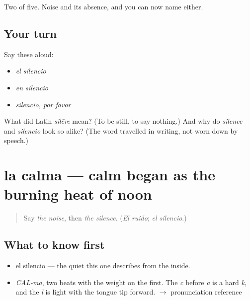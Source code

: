 \begin{grammarlens}[title={What you've built}]
Two of five. Noise and its absence, and you can now name either.
\end{grammarlens}

\subsection*{Your turn}
Say these aloud:

\begin{itemize}
\raggedright
  \item \emph{el silencio}
  \item \emph{en silencio}
  \item \emph{silencio, por favor}
\end{itemize}

\begin{tcolorbox}[breakable,colback=teal!4,colframe=teal!35!black,title={Before you move on}]
What did Latin \emph{silēre} mean? (To be still, to say nothing.) And why do \emph{silence} and \emph{silencio} look so alike? (The word travelled in writing, not worn down by speech.)
\end{tcolorbox}
\section[la calma]{la calma — calm began as the burning heat of noon}

\label{lesson:ES-C333-calma}



\begin{quote}
Say \emph{the noise}, then \emph{the silence}. (\emph{El ruido}; \emph{el silencio}.)
\end{quote}

\subsection*{What to know first}
\begin{itemize}
\raggedright
  \item el silencio — the quiet this one describes from the inside.
\end{itemize}

\begin{sounds}
\begin{itemize}
\raggedright
  \item \emph{CAL-ma}, two beats with the weight on the first. The \emph{c} before \emph{a} is a hard \emph{k}, and the \emph{l} is light with the tongue tip forward. $\to$ pronunciation reference
\end{itemize}
\end{sounds}

